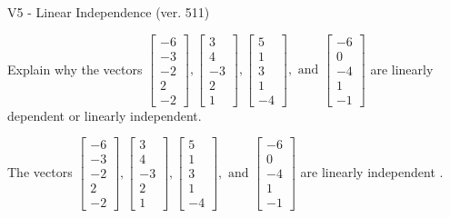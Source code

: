 \begin{exercise}
  \begin{exerciseTitle}V5 - Linear Independence (ver. 511)\end{exerciseTitle}
  \begin{exerciseStatement}
    Explain why the vectors \(\left[\begin{array}{r}
-6 \\
-3 \\
-2 \\
2 \\
-2
\end{array}\right] , \left[\begin{array}{r}
3 \\
4 \\
-3 \\
2 \\
1
\end{array}\right] , \left[\begin{array}{r}
5 \\
1 \\
3 \\
1 \\
-4
\end{array}\right] , \text{ and } \left[\begin{array}{r}
-6 \\
0 \\
-4 \\
1 \\
-1
\end{array}\right]\) are linearly dependent or linearly independent.	


  \end{exerciseStatement}
  \begin{exerciseAnswer}
   The vectors \(\left[\begin{array}{r}
-6 \\
-3 \\
-2 \\
2 \\
-2
\end{array}\right] , \left[\begin{array}{r}
3 \\
4 \\
-3 \\
2 \\
1
\end{array}\right] , \left[\begin{array}{r}
5 \\
1 \\
3 \\
1 \\
-4
\end{array}\right] , \text{ and } \left[\begin{array}{r}
-6 \\
0 \\
-4 \\
1 \\
-1
\end{array}\right]\) are 
  	 linearly independent  .
  


  \end{exerciseAnswer}
\end{exercise}